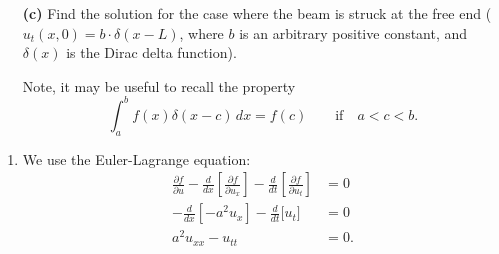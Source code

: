 \documentclass[10pt,letterpaper]{report}
\newcommand{\pp}[2]{\frac{\partial{#1}}{\partial{#2}}}
\begin{document}
\begin{enumerate}
\begin{qbox}
\begin{itemize}
    \item[\textbf{(c)}] Find the solution for the case where the beam is struck at the free end ($u_t(x, 0) = b\cdot \delta (x - L)$, where $b$ is an arbitrary positive constant, and $\delta(x)$ is the Dirac delta function). 
    
    Note, it may be useful to recall the property
    \[
    \int_a^b f(x)\delta(x - c)\,dx = f(c) \qquad \textrm{if}\quad a < c < b.
    \]
\end{itemize}
\end{qbox}
\begin{enumerate}
\item We use the Euler-Lagrange equation:
\begin{align*}
    \pp{f}{u} - \frac{d}{dx}\left[\pp{f}{u_x}\right] - \frac{d}{dt}\left[\pp{f}{u_t}\right] &= 0
    \\
    -\frac{d}{dx}\left[-a^2u_x\right] - \frac{d}{dt}\big[u_t\big]
    &= 0
    \\
    a^2 u_{xx} - u_{tt} &= 0.
\end{align*}
    

\end{enumerate}
\end{enumerate}
\end{document}
